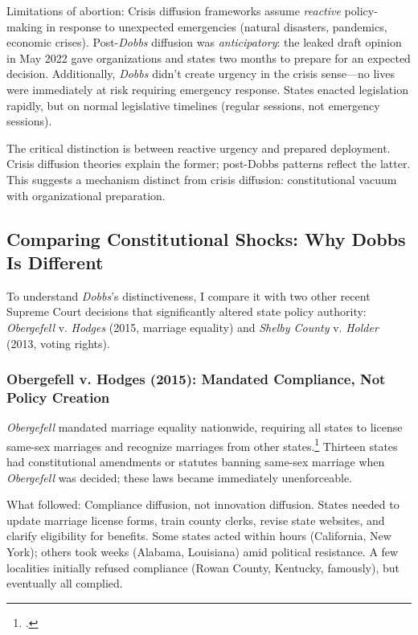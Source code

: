 Limitations of abortion: Crisis diffusion frameworks assume \emph{reactive} policy-making in response to unexpected emergencies (natural disasters, pandemics, economic crises). Post-\emph{Dobbs} diffusion was \emph{anticipatory}: the leaked draft opinion in May 2022 gave organizations and states two months to prepare for an expected decision. Additionally, \emph{Dobbs} didn't create urgency in the crisis sense---no lives were immediately at risk requiring emergency response. States enacted legislation rapidly, but on normal legislative timelines (regular sessions, not emergency sessions).

The critical distinction is between reactive urgency and prepared deployment. Crisis diffusion theories explain the former; post-Dobbs patterns reflect the latter. This suggests a mechanism distinct from crisis diffusion: constitutional vacuum with organizational preparation.

\subsection{Comparing Constitutional Shocks: Why Dobbs Is Different}

To understand \emph{Dobbs}'s distinctiveness, I compare it with two other recent Supreme Court decisions that significantly altered state policy authority: \emph{Obergefell} v. \emph{Hodges} (2015, marriage equality) and \emph{Shelby County} v. \emph{Holder} (2013, voting rights).

\subsubsection{Obergefell v. Hodges (2015): Mandated Compliance, Not Policy Creation}

\emph{Obergefell} mandated marriage equality nationwide, requiring all states to license same-sex marriages and recognize marriages from other states.\footnote{\parencite{ObergefellHodges2015}.} Thirteen states had constitutional amendments or statutes banning same-sex marriage when \emph{Obergefell} was decided; these laws became immediately unenforceable.

What followed: Compliance diffusion, not innovation diffusion. States needed to update marriage license forms, train county clerks, revise state websites, and clarify eligibility for benefits. Some states acted within hours (California, New York); others took weeks (Alabama, Louisiana) amid political resistance.\parencite{chappellSupremeCourtDeclares2015a} A few localities initially refused compliance (Rowan County, Kentucky, famously), but eventually all complied.

